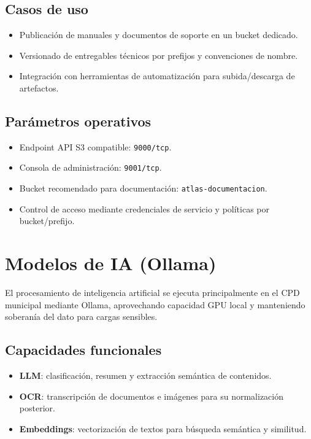 \subsection*{Casos de uso}

\begin{itemize}
\item Publicación de manuales y documentos de soporte en un bucket dedicado.
\item Versionado de entregables técnicos por prefijos y convenciones de nombre.
\item Integración con herramientas de automatización para subida/descarga de artefactos.
\end{itemize}

\subsection*{Parámetros operativos}

\begin{itemize}
\item Endpoint API S3 compatible: \texttt{9000/tcp}.
\item Consola de administración: \texttt{9001/tcp}.
\item Bucket recomendado para documentación: \texttt{atlas-documentacion}.
\item Control de acceso mediante credenciales de servicio y políticas por bucket/prefijo.
\end{itemize}

\section{Modelos de IA (Ollama)}

El procesamiento de inteligencia artificial se ejecuta principalmente en el CPD municipal mediante Ollama, aprovechando capacidad GPU local y manteniendo soberanía del dato para cargas sensibles.

\subsection*{Capacidades funcionales}

\begin{itemize}
\item \textbf{LLM}: clasificación, resumen y extracción semántica de contenidos.
\item \textbf{OCR}: transcripción de documentos e imágenes para su normalización posterior.
\item \textbf{Embeddings}: vectorización de textos para búsqueda semántica y similitud.
\end{itemize}


